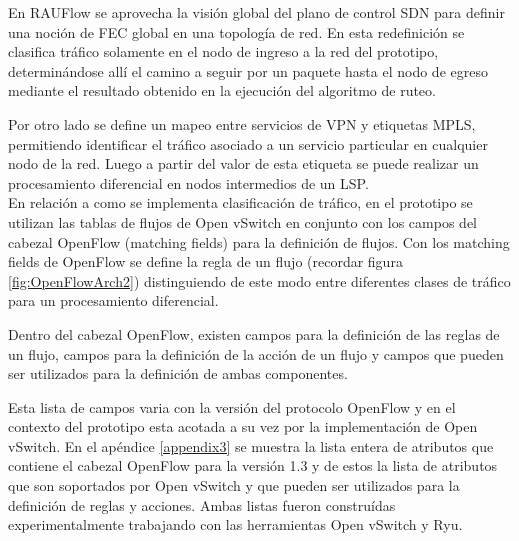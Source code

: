 En RAUFlow se aprovecha la visi\'on global del plano de control SDN para definir una noci\'on de FEC global en una topolog\'ia de red. En esta redefinici\'on se clasifica tr\'afico solamente en el nodo de ingreso a la red del prototipo, determinándose all\'i el camino a seguir por un paquete hasta el nodo de egreso mediante el resultado obtenido en la ejecuci\'on del algoritmo de ruteo. 


Por otro lado se define un mapeo entre servicios de VPN y etiquetas MPLS, permitiendo identificar el tr\'afico asociado a un servicio particular en cualquier nodo de la red. Luego a partir del valor de esta etiqueta se puede realizar un procesamiento diferencial en nodos intermedios de un LSP.\\


En relaci\'on a como se implementa clasificaci\'on de tr\'afico, en el prototipo se utilizan las tablas de flujos de Open vSwitch en conjunto con los campos del cabezal OpenFlow (matching fields) para la definici\'on de flujos. Con los matching fields de OpenFlow se define la regla de un flujo (recordar figura \ref{fig:OpenFlowArch2}) distinguiendo de este modo entre diferentes clases de tr\'afico para un procesamiento diferencial.

Dentro del cabezal OpenFlow, existen campos para la definici\'on de las reglas de un flujo, campos para la definici\'on de la acci\'on de un flujo y campos que pueden ser utilizados para la definici\'on de ambas componentes.  

Esta lista de campos varia con la versi\'on del protocolo OpenFlow y en el contexto del prototipo esta acotada a su vez por la implementaci\'on de Open vSwitch. En el ap\'endice \ref{appendix3} se muestra  la lista entera de atributos que contiene el cabezal OpenFlow para la versi\'on 1.3 y de estos la lista de atributos que son soportados por Open vSwitch y que pueden ser utilizados para la definici\'on de reglas y acciones. Ambas listas fueron constru\'idas experimentalmente trabajando con las herramientas Open vSwitch y Ryu.\\


